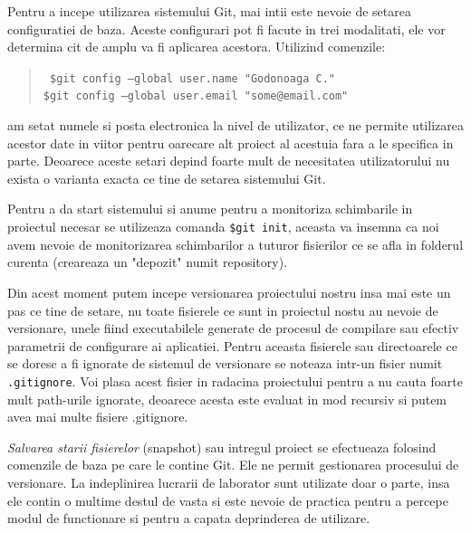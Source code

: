 Pentru a incepe utilizarea sistemului Git, mai intii este nevoie de setarea configuratiei de baza. Aceste configurari pot fi facute in trei modalitati, ele vor determina cit de amplu va fi aplicarea acestora.
Utilizind comenzile:
\begin{quote}\tt
	\$git config --global user.name "Godonoaga C."\\
	\$git config --global user.email "some@email.com"
\end{quote}
am setat numele si posta electronica la nivel de utilizator, ce ne permite utilizarea acestor date in viitor pentru oarecare alt proiect al acestuia fara a le specifica in parte.
Deoarece aceste setari depind foarte mult de necesitatea utilizatorului nu exista o varianta exacta ce tine de setarea sistemului Git.

Pentru a da start sistemului si anume pentru a monitoriza schimbarile in proiectul necesar se utilizeaza comanda {\tt \$git init}, aceasta va insemna ca noi avem nevoie de monitorizarea schimbarilor a tuturor fisierilor ce se afla in folderul curenta (creareaza un "depozit" numit repository).

Din acest moment putem incepe versionarea proiectului nostru insa mai este un pas ce tine de setare, nu toate fisierele ce sunt in proiectul nostu au nevoie de versionare, unele fiind executabilele generate de procesul de compilare sau efectiv parametrii de configurare ai aplicatiei. Pentru aceasta fisierele sau directoarele ce se doresc a fi ignorate de sistemul de versionare se noteaza intr-un fisier numit {\tt.gitignore}. Voi plasa acest fisier in radacina proiectului pentru a nu cauta foarte mult path-urile ignorate, deoarece acesta este evaluat in mod recursiv si putem avea mai multe fisiere .gitignore.

\emph{Salvarea starii fisierelor} (snapshot) sau intregul proiect se efectueaza folosind comenzile de baza pe care le contine Git. Ele ne permit gestionarea procesului de versionare. La indeplinirea lucrarii de laborator sunt utilizate doar o parte, insa ele contin o multime destul de vasta si este nevoie de practica pentru a percepe modul de functionare si pentru a capata deprinderea de utilizare.


